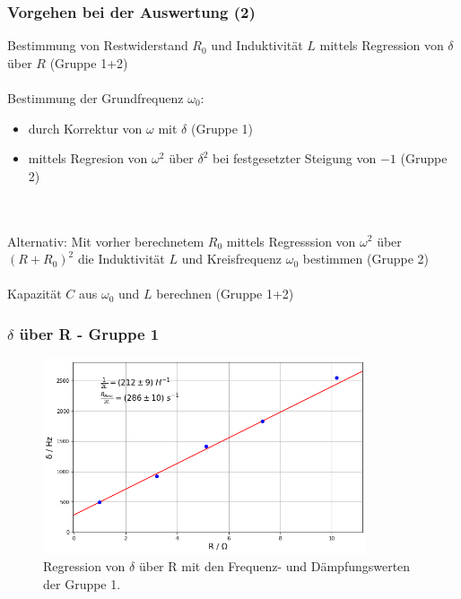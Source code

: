\documentclass{beamer}
\begin{document}
\begin{frame}
\frametitle{Vorgehen bei der Auswertung (2)}
Bestimmung von Restwiderstand $R_0$ und Induktivität $L$ mittels Regression von $\delta$ über $R$ (Gruppe 1+2) \\
\ \\
Bestimmung der Grundfrequenz $\omega_0$:
\begin{itemize}
\item durch Korrektur von $\omega$ mit $\delta$ (Gruppe 1)
\item mittels Regresion von $\omega^2$ über $\delta^2$ bei festgesetzter Steigung von $-1$ (Gruppe 2)
\end{itemize} 
\ \\
\ \\
Alternativ: Mit vorher berechnetem $R_0$ mittels Regresssion von $\omega^2$ über $(R+R_0)^2$ die Induktivität $L$ und Kreisfrequenz $\omega_0$ bestimmen (Gruppe 2) \\
\ \\
Kapazität $C$ aus $\omega_0$ und $L$ berechnen (Gruppe 1+2)

\end{frame}

\begin{frame}
\frametitle{$\delta$ über R - Gruppe 1}
\begin{figure}
\centering
\includegraphics[width=0.85\textwidth]{abbildungen/LCRegression.png}
\caption{Regression von $\delta$ über R mit den Frequenz- und Dämpfungswerten der Gruppe 1.}
\end{figure}

\end{frame}
\end{document}
